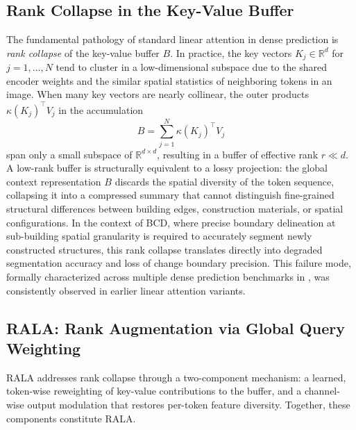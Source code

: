\subsection{Rank Collapse in the Key-Value Buffer}

The fundamental pathology of standard linear attention in dense prediction is \emph{rank collapse} of the key-value buffer $B$. In practice, the key vectors $K_j \in \mathbb{R}^d$ for $j = 1, \ldots, N$ tend to cluster in a low-dimensional subspace due to the shared encoder weights and the similar spatial statistics of neighboring tokens in an image. When many key vectors are nearly collinear, the outer products $\kappa(K_j)^\top V_j$ in the accumulation
\begin{equation}
B = \sum_{j=1}^{N} \kappa(K_j)^\top V_j
\label{eq:standard_kv_buffer}
\end{equation}
span only a small subspace of $\mathbb{R}^{d \times d}$, resulting in a buffer of effective rank $r \ll d$. A low-rank buffer is structurally equivalent to a lossy projection: the global context representation $B$ discards the spatial diversity of the token sequence, collapsing it into a compressed summary that cannot distinguish fine-grained structural differences between building edges, construction materials, or spatial configurations. In the context of \ac{BCD}, where precise boundary delineation at sub-building spatial granularity is required to accurately segment newly constructed structures, this rank collapse translates directly into degraded segmentation accuracy and loss of change boundary precision. This failure mode, formally characterized across multiple dense prediction benchmarks in \cite{Fan2025RALA}, was consistently observed in earlier linear attention variants.

\subsection{RALA: Rank Augmentation via Global Query Weighting}

\ac{RALA} \cite{Fan2025RALA} addresses rank collapse through a two-component mechanism: a learned, token-wise reweighting of key-value contributions to the buffer, and a channel-wise output modulation that restores per-token feature diversity. Together, these components constitute \ac{RALA}.

